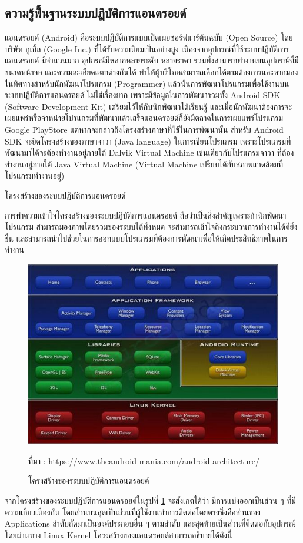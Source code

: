 	\subsection{ความรู้พื้นฐานระบบปฏิบัติการแอนดรอยด์}


	แอนดรอยด์ (Android) คือระบบปฏิบัติการแบบเปิดเผยซอร์ฟแวร์ต้นฉบับ (Open Source) โดยบริษัท กูเกิ้ล (Google Inc.) ที่ได้รับความนิยมเป็นอย่างสูง เนื่องจากอุปกรณ์ที่ใช้ระบบปฏิบัติการแอนดรอยด์ มีจำนวนมาก อุปกรณ์มีหลากหลายระดับ หลายราคา รวมทั้งสามารถทำงานบนอุปกรณ์ที่มีขนาดหน้าจอ และความละเอียดแตกต่างกันได้ ทำให้ผู้บริโภคสามารถเลือกได้ตามต้องการและหากมองในทิศทางสำหรับนักพัฒนาโปรแกรม (Programmer) แล้วนั้นการพัฒนาโปรแกรมเพื่อใช้งานบนระบบปฏิบัติการแอนดรอยด์ ไม่ใช่เรื่องยาก เพราะมีข้อมูลในการพัฒนารวมทั้ง Android SDK (Software Development Kit) เตรียมไว้ให้กับนักพัฒนาได้เรียนรู้ และเมื่อนักพัฒนาต้องการจะเผยแพร่หรือจำหน่ายโปรแกรมที่พัฒนาแล้วเสร็จแอนดรอยด์ก็ยังมีตลาดในการเผยแพร่โปรแกรม Google PlayStore แต่หากจะกล่าวถึงโครงสร้างภาษาที่ใช้ในการพัฒนานั้น สำหรับ Android SDK จะยึดโครงสร้างของภาษาจาวา (Java language) ในการเขียนโปรแกรม เพราะโปรแกรมที่พัฒนามาได้จะต้องทำงานอยู่ภายใต้ Dalvik Virtual Machine เช่นเดียวกับโปรแกรมจาวา ที่ต้องทำงานอยู่ภายใต้ Java Virtual Machine (Virtual Machine เปรียบได้กับสภาพแวดล้อมที่โปรแกรมทำงานอยู่)
	
	โครงสร้างของระบบปฏิบัติการแอนดรอยด์


	การทำความเข้าใจโครงสร้างของระบบปฏิบัติการแอนดรอยด์ \cite{androidbook1} ถือว่าเป็นสิ่งสำคัญเพราะถ้านักพัฒนาโปรแกรม สามารถมองภาพโดยรวมของระบบได้ทั้งหมด จะสามารถเข้าใจถึงกระบวนการทำงานได้ดียิ่งขึ้น และสามารถนำไปช่วยในการออกแบบโปรแกรมที่ต้องการพัฒนาเพื่อให้เกิดประสิทธิภาพในการทำงาน
	
	\begin{figure}[H]
		\centering
		\includegraphics[width=0.8\columnwidth]{Figures/2/androidarchitecture}
		\caption{โครงสร้างของระบบปฏิบัติการแอนดรอยด์}{ที่มา : https://www.theandroid-mania.com/android-architecture/}
		\label{Fig:androidarchitecture}
	\end{figure}
	จากโครงสร้างของระบบปฏิบัติการแอนดรอยด์ในรูปที่ \ref{Fig:androidarchitecture} จะสังเกตได้ว่า มีการแบ่งออกเป็นส่วน ๆ ที่มีความเกี่ยวเนื่องกัน โดยส่วนบนสุดเป็นส่วนที่ผู้ใช้งานทำการติดต่อโดยตรงซึ่งคือส่วนของ Applications ลำดับถัดมาเป็นองค์ประกอบอื่น ๆ ตามลำดับ และสุดท้ายเป็นส่วนที่ติดต่อกับอุปกรณ์โดยผ่านทาง Linux Kernel โครงสร้างของแอนดรอยด์สามารถอธิบายได้ดังนี้

